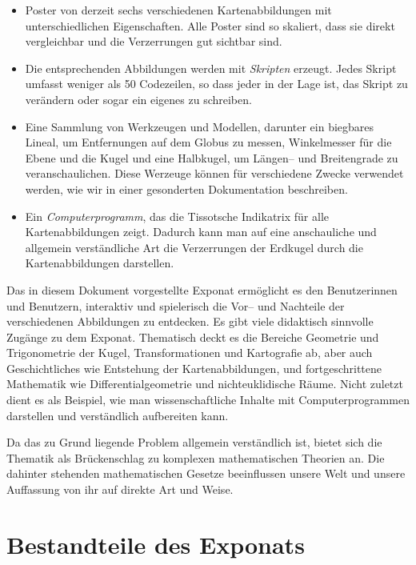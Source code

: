 \documentclass[a4paper,12pt]{article}
\begin{document}
\begin{itemize}
 \item Poster von derzeit sechs verschiedenen Kartenabbildungen mit unterschiedlichen
       Eigenschaften. Alle Poster sind so skaliert, dass sie direkt vergleichbar 
       und die Verzerrungen gut sichtbar sind.
 \item Die entsprechenden Abbildungen werden mit \emph{Skripten} erzeugt. Jedes Skript 
       umfasst weniger als 50 Codezeilen, so dass jeder in der Lage ist, das Skript
       zu verändern oder sogar ein eigenes zu schreiben.
 \item Eine Sammlung von Werkzeugen und Modellen, darunter ein biegbares Lineal,
       um Entfernungen auf dem Globus zu messen, Winkelmesser für die Ebene und die 
       Kugel und eine Halbkugel, um Längen-- und Breitengrade zu veranschaulichen.
       Diese Werzeuge können für verschiedene Zwecke verwendet werden, wie wir in einer 
       gesonderten Dokumentation beschreiben.
 \item Ein \emph{Computerprogramm}, das die Tissotsche Indikatrix für alle 
       Kartenabbildungen zeigt. Dadurch kann man auf eine anschauliche und allgemein 
       verständliche Art die Verzerrungen der Erdkugel durch die Kartenabbildungen 
       darstellen.
\end{itemize}

Das in diesem Dokument vorgestellte Exponat ermöglicht es den Benutzerinnen und  
Benutzern, interaktiv und spielerisch die Vor-- und Nachteile der verschiedenen 
Abbildungen zu entdecken. 
Es gibt viele didaktisch sinnvolle Zugänge zu dem Exponat. Thematisch 
deckt es die Bereiche Geometrie und Trigonometrie der Kugel, Transformationen und 
Kartografie ab, aber auch Geschichtliches wie Entstehung der Kartenabbildungen, und 
fortgeschrittene Mathematik wie Differentialgeometrie und nichteuklidische Räume. 
Nicht zuletzt dient es als Beispiel, wie man wissenschaftliche Inhalte mit 
Computerprogrammen darstellen und verständlich aufbereiten kann.

Da das zu Grund liegende Problem allgemein verständlich ist, bietet sich die Thematik als
Brückenschlag zu komplexen mathematischen Theorien an. Die dahinter stehenden mathematischen
Gesetze beeinflussen unsere Welt und unsere Auffassung von ihr auf direkte Art und Weise.


\section{Bestandteile des Exponats}
\end{document}
